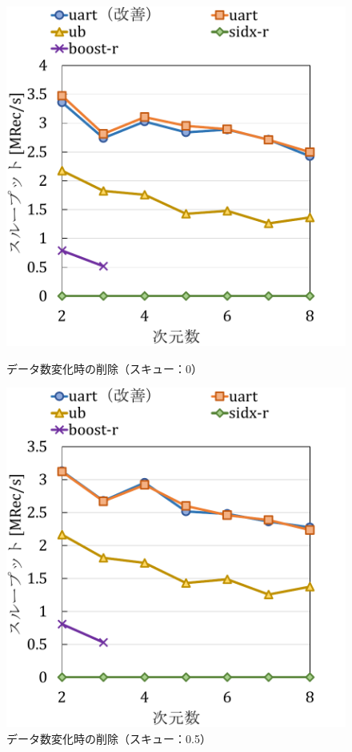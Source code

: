 \begin{figure}[tb]
  \begin{minipage}[c]{0.495\textwidth}
    \centering
    \includegraphics[scale=0.5]{./figures/graph-dimention-delete-0.pdf}
    \caption{データ数変化時の削除（スキュー：0）}
    \label{graph:grouped}
  \end{minipage}
  \begin{minipage}[c]{0.495\textwidth}
    \centering
    \includegraphics[scale=0.5]{./figures/graph-dimention-delete-0.5.pdf}
    \caption{データ数変化時の削除（スキュー：0.5）}
    \label{graph:paired}
  \end{minipage}
\end{figure}

